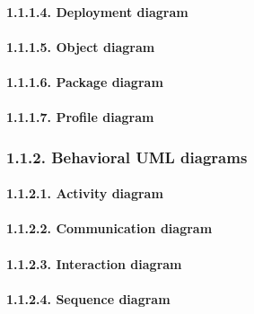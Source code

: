 \documentclass[
]{article}
\begin{document}
\hypertarget{deployment-diagram-1}{%
\paragraph{1.1.1.4. Deployment diagram}\label{deployment-diagram-1}}

\hypertarget{object-diagram-1}{%
\paragraph{1.1.1.5. Object diagram}\label{object-diagram-1}}

\hypertarget{package-diagram-1}{%
\paragraph{1.1.1.6. Package diagram}\label{package-diagram-1}}

\hypertarget{profile-diagram-1}{%
\paragraph{1.1.1.7. Profile diagram}\label{profile-diagram-1}}

\hypertarget{behavioral-uml-diagrams-1}{%
\subsubsection{1.1.2. Behavioral UML
diagrams}\label{behavioral-uml-diagrams-1}}

\hypertarget{activity-diagram-1}{%
\paragraph{1.1.2.1. Activity diagram}\label{activity-diagram-1}}

\hypertarget{communication-diagram-1}{%
\paragraph{1.1.2.2. Communication
diagram}\label{communication-diagram-1}}

\hypertarget{interaction-diagram-1}{%
\paragraph{1.1.2.3. Interaction diagram}\label{interaction-diagram-1}}

\hypertarget{sequence-diagram-1}{%
\paragraph{1.1.2.4. Sequence diagram}\label{sequence-diagram-1}}
\end{document}

